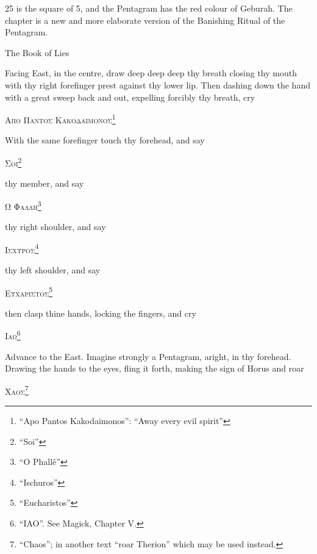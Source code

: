 
\epigraph{25 is the square of 5, and the Pentagram has the red colour of Geburah. The chapter is a new and more elaborate version of the Banishing Ritual of the Pentagram.}{The Book of Lies}


Facing East, in the centre, draw deep deep deep thy breath closing thy mouth with thy right forefinger prest against thy lower lip. Then dashing down the hand with a great sweep back and out, expelling forcibly thy breath, cry


\begin{quoting}[indentfirst=false]
\textgreek{\textsc{Απο Παντος Κακοδαιμονος}}\footnote{\enquote{Apo Pantos Kakodaimonos}: \enquote{Away every evil spirit}}
\end{quoting}

With the same forefinger touch thy forehead, and say
\begin{quoting}[indentfirst=false]
\textgreek{\textsc{Σοι}}\footnote{\enquote{Soi}}
\end{quoting}

thy member, and say
\begin{quoting}[indentfirst=false]
\textgreek{\textsc{Ω Φαλλη}}\footnote{\enquote{O Phall\^e}}
\end{quoting}

thy right shoulder, and say
\begin{quoting}[indentfirst=false]
\textgreek{\textsc{Ισχυροσ}}\footnote{\enquote{Ischuros}}
\end{quoting}

thy left shoulder, and say
\begin{quoting}[indentfirst=false]
\textgreek{\textsc{Ευχαριστοσ}}\footnote{\enquote{Eucharistos}}
\end{quoting}

then clasp thine hands, locking the fingers, and cry
\begin{quoting}[indentfirst=false]
\textgreek{\textsc{Ιαω}}\footnote{\enquote{IAO}. See Magick, Chapter V.}
\end{quoting}

Advance to the East. Imagine strongly a Pentagram, aright, in thy forehead. Drawing the hands to the eyes, fling it forth, making the sign of Horus and roar
\begin{quoting}[indentfirst=false]
\textgreek{\textsc{Χαοσ}}\footnote{\enquote{Chaos}; in another text \enquote{roar Therion} which may be used instead.}
\end{quoting}

